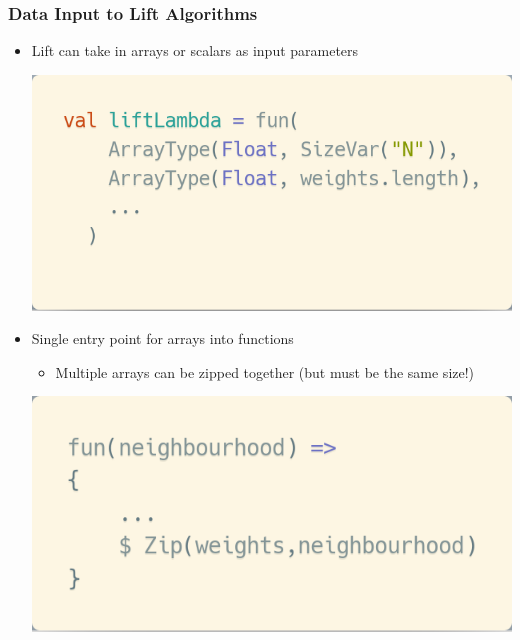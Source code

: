 \documentclass[10pt]{beamer}
\begin{document}
\begin{frame}
\frametitle{Data Input to Lift Algorithms}
\begin{itemize}
    \item Lift can take in arrays or scalars as input parameters
            \vspace{-.4cm}
\begin{block}{}
    \begin{center}
    \includegraphics[width=.5\textwidth]{../images/inputData.png}
    \end{center}
\end{block}
    \item Single entry point for arrays into functions  
            \begin{itemize}
                \item Multiple arrays can be zipped together (but must be the same size!) 
            \end{itemize}
            \vspace{-.4cm}
\begin{block}{}
    \begin{center}
    \includegraphics[width=.5\textwidth]{../images/zippedData.png}
    \end{center}
\end{block}
\end{itemize}
\end{frame}
\end{document}
